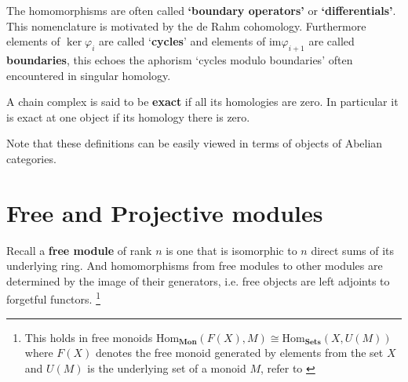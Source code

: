 \documentclass[12pt]{article}
\numberwithin{equation}{section}
\begin{document}
	The homomorphisms are often called \textbf{`boundary operators'} or \textbf{`differentials'}. This nomenclature is motivated by the de Rahm cohomology. Furthermore elements of $\ker \varphi_i$ are called `\textbf{cycles}' and elements of $\mathrm{im} \varphi_{i+1}$ are called \textbf{boundaries}, this echoes the aphorism `cycles modulo boundaries' often encountered in singular homology.
	
	A chain complex is said to be \textbf{exact} if all its homologies are zero. In particular it is exact at one object if its homology there is zero.
	
	Note that these definitions can be easily viewed in terms of objects of Abelian categories.
	
	\section{Free and Projective modules}
	Recall a\textbf{ free module} of rank $n$ is one that is isomorphic to $n$ direct sums of its underlying ring. And homomorphisms from free modules to other modules are determined by the image of their generators, i.e. free objects are left adjoints to forgetful functors. \footnote{This holds in free monoids $\mathrm{Hom}_\mathbf{Mon}(F(X), M) \cong \mathrm{Hom}_\mathbf{Sets} (X, U(M))$ where $F(X)$ denotes the free monoid generated by elements from the set $X$ and $U(M)$ is the underlying set of a monoid $M$, refer to \cite[p. ~208]{Awodey} }
	
\end{document}
